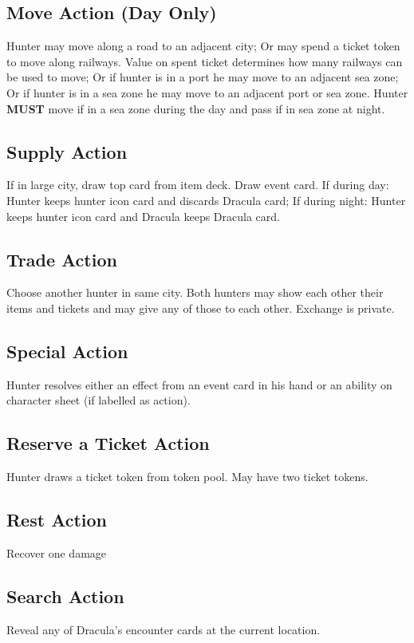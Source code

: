 \documentclass[12pt]{article}
\begin{document}
\begin{multicols*}{2}
\subsection*{Move Action (Day Only)}
Hunter may move along a road to an adjacent city; Or may spend a ticket token to move along railways. Value on spent ticket determines how many railways can be used to move; Or if hunter is in a port he may move to an adjacent sea zone; Or if hunter is in a sea zone he may move to an adjacent port or sea zone. Hunter \textbf{MUST} move if in a sea zone during the day and pass if in sea zone at night.

\subsection*{Supply Action}
If in large city, draw top card from item deck. Draw event card. If during day: Hunter keeps hunter icon card and discards Dracula card; If during night: Hunter keeps hunter icon card and Dracula keeps Dracula card.

\subsection*{Trade Action}
Choose another hunter in same city. Both hunters may show each other their items and tickets and may give any of those to each other. Exchange is private.

\subsection*{Special Action}
Hunter resolves either an effect from an event card in his hand or an ability on character sheet (if labelled as action).

\subsection*{Reserve a Ticket Action}
Hunter draws a ticket token from token pool. May have two ticket tokens.

\subsection*{Rest Action}
Recover one damage

\subsection*{Search Action}
Reveal any of Dracula's encounter cards at the current location.


\end{multicols*}
\end{document}

